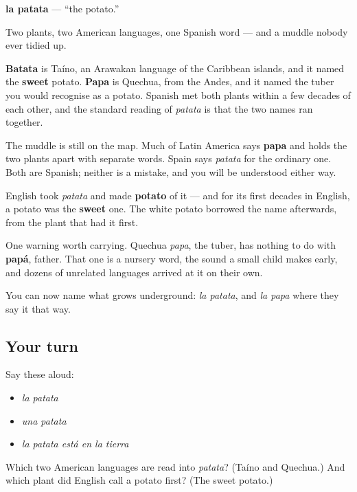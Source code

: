 \begin{cousinweb}
\textbf{la patata} — \textquotedblleft{}the potato.\textquotedblright{}

Two plants, two American languages, one Spanish word — and a muddle nobody ever tidied up.

\textbf{Batata} is Taíno, an Arawakan language of the Caribbean islands, and it named the \textbf{sweet} potato. \textbf{Papa} is Quechua, from the Andes, and it named the tuber you would recognise as a potato. Spanish met both plants within a few decades of each other, and the standard reading of \emph{patata} is that the two names ran together.

The muddle is still on the map. Much of Latin America says \textbf{papa} and holds the two plants apart with separate words. Spain says \emph{patata} for the ordinary one. Both are Spanish; neither is a mistake, and you will be understood either way.

English took \emph{patata} and made \textbf{potato} of it — and for its first decades in English, a potato was the \textbf{sweet} one. The white potato borrowed the name afterwards, from the plant that had it first.

One warning worth carrying. Quechua \emph{papa}, the tuber, has nothing to do with \textbf{papá}, father. That one is a nursery word, the sound a small child makes early, and dozens of unrelated languages arrived at it on their own.
\end{cousinweb}

\begin{grammarlens}[title={What you've built}]
You can now name what grows underground: \emph{la patata}, and \emph{la papa} where they say it that way.
\end{grammarlens}

\subsection*{Your turn}
Say these aloud:

\begin{itemize}
\raggedright
  \item \emph{la patata}
  \item \emph{una patata}
  \item \emph{la patata está en la tierra}
\end{itemize}

\begin{tcolorbox}[breakable,colback=teal!4,colframe=teal!35!black,title={Before you move on}]
Which two American languages are read into \emph{patata}? (Taíno and Quechua.) And which plant did English call a potato first? (The sweet potato.)
\end{tcolorbox}

